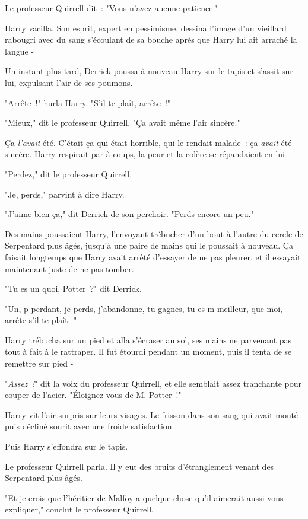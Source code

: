 Le professeur Quirrell dit~: "Vous n'avez aucune patience."

Harry vacilla. Son esprit, expert en pessimisme, dessina l'image d'un vieillard rabougri avec du sang s'écoulant de sa bouche après que Harry lui ait arraché la langue -

Un instant plus tard, Derrick poussa à nouveau Harry sur le tapis et s'assit sur lui, expulsant l'air de ses poumons.

"Arrête~!" hurla Harry. "S'il te plaît, arrête~!"

"Mieux," dit le professeur Quirrell. "Ça avait même l'air sincère."

Ça \emph{l'avait} été. C'était ça qui était horrible, qui le rendait malade~: ça \emph{avait} été sincère. Harry respirait par à-coups, la peur et la colère se répandaient en lui -

"Perdez," dit le professeur Quirrell.

"Je, perds," parvint à dire Harry.

"J'aime bien ça," dit Derrick de son perchoir. "Perds encore un peu."

\later

Des mains poussaient Harry, l'envoyant trébucher d'un bout à l'autre du cercle de Serpentard plus âgés, jusqu'à une paire de mains qui le poussait à nouveau. Ça faisait longtemps que Harry avait arrêté d'essayer de ne pas pleurer, et il essayait maintenant juste de ne pas tomber.

"Tu es un quoi, Potter~?" dit Derrick.

"Un, p-perdant, je perds, j'abandonne, tu gagnes, tu es m-meilleur, que moi, arrête s'il te plaît -"

Harry trébucha sur un pied et alla s'écraser au sol, ses mains ne parvenant pas tout à fait à le rattraper. Il fut étourdi pendant un moment, puis il tenta de se remettre sur pied -

"\emph{Assez~!}" dit la voix du professeur Quirrell, et elle semblait assez tranchante pour couper de l'acier. "Éloignez-vous de M. Potter~!"

Harry vit l'air surpris sur leurs visages. Le frisson dans son sang qui avait monté puis décliné sourit avec une froide satisfaction.

Puis Harry s'effondra sur le tapis.

Le professeur Quirrell parla. Il y eut des bruits d'étranglement venant des Serpentard plus âgés.

"Et je crois que l'héritier de Malfoy a quelque chose qu'il aimerait aussi vous expliquer," conclut le professeur Quirrell.

